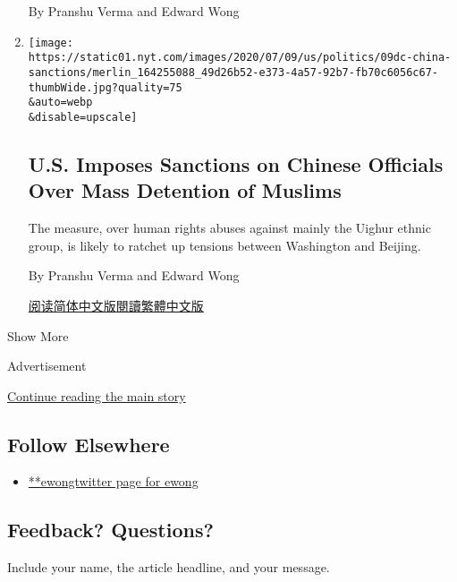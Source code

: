 \begin{enumerate}
  By Pranshu Verma and Edward Wong
\item
  \href{/2020/07/09/world/asia/trump-china-sanctions-uighurs.html}{}

  \texttt{[image: https://static01.nyt.com/images/2020/07/09/us/politics/09dc-china-sanctions/merlin\_164255088\_49d26b52-e373-4a57-92b7-fb70c6056c67-thumbWide.jpg?quality=75\\\&auto=webp\\\&disable=upscale]}

  \hypertarget{us-imposes-sanctions-on-chinese-officials-over-mass-detention-of-muslims}{%
  \subsection{U.S. Imposes Sanctions on Chinese Officials Over Mass
  Detention of
  Muslims}\label{us-imposes-sanctions-on-chinese-officials-over-mass-detention-of-muslims}}

  The measure, over human rights abuses against mainly the Uighur ethnic
  group, is likely to ratchet up tensions between Washington and
  Beijing.

  By Pranshu Verma and Edward Wong

  \href{https://cn.nytimes.com/usa/20200710/trump-china-sanctions-uighurs/}{阅读简体中文版}\href{https://cn.nytimes.com/usa/20200710/trump-china-sanctions-uighurs/zh0-}{閱讀繁體中文版}
\end{enumerate}

Show More

Advertisement

\protect\hyperlink{after-mid2}{Continue reading the main story}

\hypertarget{follow-elsewhere}{%
\subsection{Follow Elsewhere}\label{follow-elsewhere}}

\begin{itemize}
\tightlist
\item
  \href{https://twitter.com/ewong}{**ewongtwitter page for ewong}
\end{itemize}

\hypertarget{feedback-questions}{%
\subsection{Feedback? Questions?}\label{feedback-questions}}

Include your name, the article headline, and your message.


